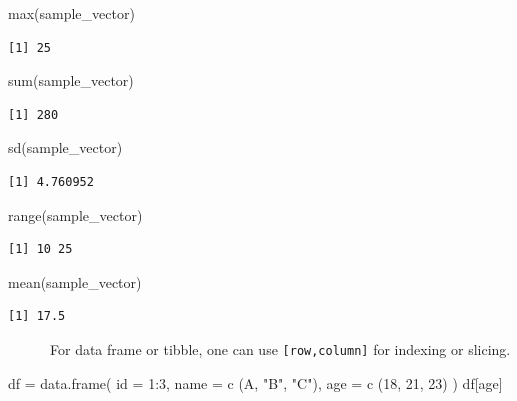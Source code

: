 \documentclass[
  letterpaper,
  DIV=11,
  numbers=noendperiod]{scrreprt}
\newenvironment{Shaded}{\begin{snugshade}}{\end{snugshade}}
\newcommand{\AttributeTok}[1]{\textcolor[rgb]{0.40,0.45,0.13}{#1}}
\newcommand{\DecValTok}[1]{\textcolor[rgb]{0.68,0.00,0.00}{#1}}
\newcommand{\FunctionTok}[1]{\textcolor[rgb]{0.28,0.35,0.67}{#1}}
\newcommand{\NormalTok}[1]{\textcolor[rgb]{0.00,0.23,0.31}{#1}}
\newcommand{\OtherTok}[1]{\textcolor[rgb]{0.00,0.23,0.31}{#1}}
\newcommand{\SpecialCharTok}[1]{\textcolor[rgb]{0.37,0.37,0.37}{#1}}
\newcommand{\StringTok}[1]{\textcolor[rgb]{0.13,0.47,0.30}{#1}}
\begin{document}
\begin{Shaded}
\begin{Highlighting}[]
\FunctionTok{max}\NormalTok{(sample\_vector)}
\end{Highlighting}
\end{Shaded}

\begin{verbatim}
[1] 25
\end{verbatim}

\begin{Shaded}
\begin{Highlighting}[]
\FunctionTok{sum}\NormalTok{(sample\_vector)}
\end{Highlighting}
\end{Shaded}

\begin{verbatim}
[1] 280
\end{verbatim}

\begin{Shaded}
\begin{Highlighting}[]
\FunctionTok{sd}\NormalTok{(sample\_vector)}
\end{Highlighting}
\end{Shaded}

\begin{verbatim}
[1] 4.760952
\end{verbatim}

\begin{Shaded}
\begin{Highlighting}[]
\FunctionTok{range}\NormalTok{(sample\_vector)}
\end{Highlighting}
\end{Shaded}

\begin{verbatim}
[1] 10 25
\end{verbatim}

\begin{Shaded}
\begin{Highlighting}[]
\FunctionTok{mean}\NormalTok{(sample\_vector)}
\end{Highlighting}
\end{Shaded}

\begin{verbatim}
[1] 17.5
\end{verbatim}

~~~~~~For data frame or tibble, one can use \texttt{{[}row,column{]}}
for indexing or slicing.

\begin{Shaded}
\begin{Highlighting}[]
\NormalTok{df }\OtherTok{=} \FunctionTok{data.frame}\NormalTok{(}
    \AttributeTok{id =} \DecValTok{1}\SpecialCharTok{:}\DecValTok{3}\NormalTok{,}
    \AttributeTok{name =} \FunctionTok{c}\NormalTok{ (}\StringTok{\textquotesingle{}A\textquotesingle{}}\NormalTok{, }\StringTok{"B"}\NormalTok{, }\StringTok{"C"}\NormalTok{),}
    \AttributeTok{age =} \FunctionTok{c}\NormalTok{ (}\DecValTok{18}\NormalTok{, }\DecValTok{21}\NormalTok{, }\DecValTok{23}\NormalTok{)}
\NormalTok{)}
\NormalTok{df[}\StringTok{\textquotesingle{}age\textquotesingle{}}\NormalTok{]}
\end{Highlighting}
\end{Shaded}
\end{document}
